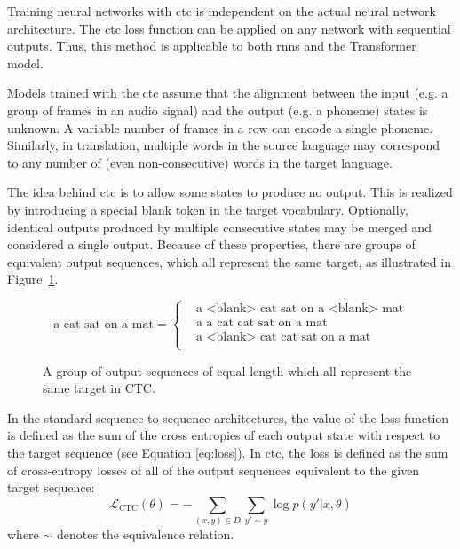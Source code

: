 Training neural networks with \ac{ctc} is independent on the actual neural
network architecture. The \ac{ctc} loss function can be applied on any network
with sequential outputs. Thus, this method is applicable to both \acp{rnn} and
the Transformer model.

Models trained with the \ac{ctc} assume that the alignment between the input
(e.g. a group of frames in an audio signal) and the output (e.g. a phoneme)
states is unknown. A variable number of frames in a row can encode a single
phoneme. Similarly, in translation, multiple words in the source language may
correspond to any number of (even non-consecutive) words in the target
language.

The idea behind \ac{ctc} is to allow some states to produce no output. This is
realized by introducing a special blank token in the target vocabulary.
Optionally, identical outputs produced by multiple consecutive states may be
merged and considered a single output. Because of these properties, there are
groups of equivalent output sequences, which all represent the same target, as
illustrated in Figure~\ref{fig:ctc-equivalent-sequences}.

\begin{figure}
  \centering
  \begin{minipage}{\textwidth}
    \begin{equation*}
        \text{a cat sat on a mat} =
        \begin{cases}
          & \text{a <blank> cat sat on a <blank> mat} \\
          & \text{a a cat cat sat on a mat} \\
          & \text{a <blank> cat cat sat on a mat} \\
        \end{cases}
    \end{equation*}
  \end{minipage}
  \caption{A group of output sequences of equal length which all represent the
    same target in CTC.} %
  \label{fig:ctc-equivalent-sequences}
\end{figure}

In the standard sequence-to-sequence architectures, the value of the loss
function is defined as the sum of the cross entropies of each output state with
respect to the target sequence (see Equation \ref{eq:loss}). In \ac{ctc}, the
loss is defined as the sum of cross-entropy losses of all of the output
sequences equivalent to the given target sequence:
%
\begin{equation}
  \mathcal{L}_{\text{CTC}}({\theta}) = - \sum_{(x, y) \in D} \sum_{y' \sim y}  \log p(y' | x, \theta)
  \label{eq:ctc-loss}
\end{equation}
%
where $\sim$ denotes the equivalence relation. %

